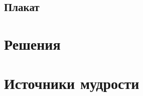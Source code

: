 \documentclass[12pt]{article}
\newcounter{problem}[section]
\theoremstyle{definition}
\begin{document}
\subsection{Плакат}






\renewenvironment{solution}[1]{%
         \vskip .5cm plus 2cm minus 0.1cm%
         {\bfseries \hyperlink{problem:#1}{#1.}}%
}%
{%
}%



\section{Решения}



\section{Источники мудрости}

\end{document}
